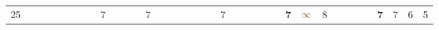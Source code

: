 \begin{landscape}
\begin{table}
\begin{adjustwidth}{-2.6cm}{}
{\begin{tabular}{l|lllllllllllllllllllllllllllllllll|ll}
		25   &            &                                                                 &                                                                 &                                                                 &                                                                 &                                                                 &                                                                 & 7                                                               &                                                                 &                                                                 &                                                                 & 7                                                               &                                                                 &                                                                 &                                                                 &                                                                 &                                                                 &                                                                 & 7                                                               &                                                                 &                                                                 &                                                                 &                                                                 &                                                                 & \textbf{7}                                                      & $\textcolor[rgb]{0.541,0.29,0.043}{\infty}$ & 8                                                               &                                                                 &                                                                 &                                                                 &                                                                 & \textbf{7}                                                      & 7                                                               & 6          & 5           \\

\end{tabular}}
\end{adjustwidth}
\end{table}
\end{landscape}
